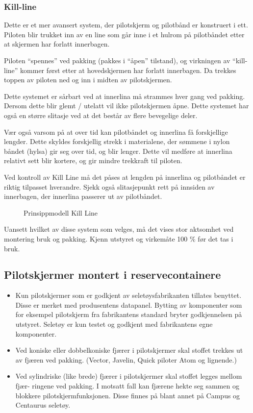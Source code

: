 \subsubsection{Kill-line}
Dette er et mer avansert system, der pilotskjerm og pilotbånd er konstruert i ett. Piloten blir trukket inn av en line som går inne i et hulrom på pilotbåndet etter at skjermen har forlatt innerbagen.

Piloten ``spennes'' ved pakking (pakkes i ``åpen'' tilstand), og virkningen av ``kill-line'' kommer først etter at hovedskjermen har forlatt innerbagen. Da trekkes toppen av piloten ned og inn i midten av pilotskjermen.

Dette systemet er sårbart ved at innerlina må strammes hver gang ved pakking. Dersom dette blir glemt / utelatt vil ikke pilotskjermen åpne. Dette systemet har også en større slitasje ved at det består av flere bevegelige deler.

Vær også varsom på at over tid kan pilotbåndet og innerlina få forskjellige lengder. Dette skyldes forskjellig strekk i materialene, der sømmene i nylon båndet (hylsa) gir seg over tid, og blir lenger. Dette vil medføre at innerlina relativt sett blir kortere, og gir mindre trekkraft til piloten.

Ved kontroll av Kill Line må det påses at lengden på innerlina og pilotbåndet er riktig tilpasset hverandre. Sjekk også slitasjepunkt rett på innsiden av innerbagen, der innerlina passerer ut av pilotbåndet.

\begin{figure}
	\caption{Prinsippmodell Kill Line}
\end{figure}

Uansett hvilket av disse system som velges, må det vises stor aktsomhet ved montering bruk og pakking. Kjenn utstyret og virkemåte 100 \% før det tas i bruk.

\subsection{Pilotskjermer montert i reservecontainere}
\begin{itemize}
\item Kun pilotskjermer som er godkjent av seletøysfabrikanten tillates benyttet. Disse er merket med produsentens datapanel. Bytting av komponenter som for eksempel pilotskjerm fra fabrikantens standard bryter godkjennelsen på utstyret. Seletøy er kun testet og godkjent med fabrikantens egne komponenter.
\item Ved koniske eller dobbelkoniske fjærer i pilotskjermer skal stoffet trekkes ut av fjæren ved pakking. (Vector, Javelin, Quick piloter Atom og lignende.)
\item Ved sylindriske (like brede) fjærer i pilotskjermer skal stoffet legges mellom fjær- ringene ved pakking. I motsatt fall kan fjærene hekte seg sammen og blokkere pilotskjermfunksjonen. Disse finnes på blant annet på Campus og Centaurus seletøy.
\end{itemize}

